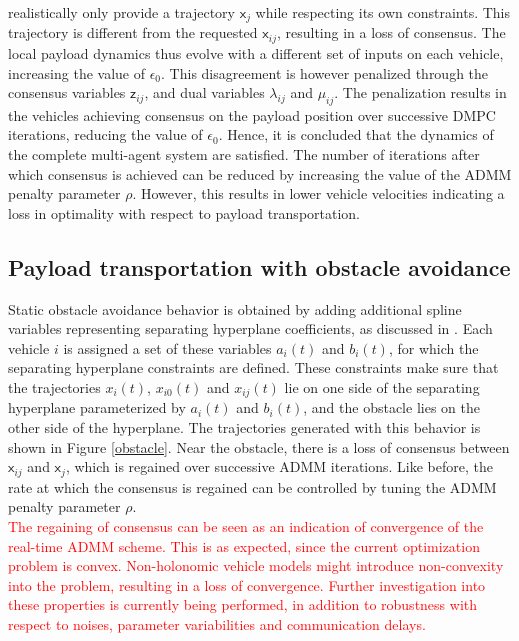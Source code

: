 \documentclass[letterpaper, 10 pt, conference]{ieeeconf}
\newcommand{\cx}{\textsf{x}}
\newcommand{\cz}{\textsf{z}}
\begin{document}
 realistically only provide a trajectory $\cx_j$ while respecting its own constraints. This trajectory is different from the requested $\cx_{ij}$, resulting in a loss of consensus. The local payload dynamics thus evolve with a different set of inputs on each vehicle, increasing the value of $\epsilon_0$. This disagreement is however penalized through the consensus variables $\cz_{ij}$, and dual variables $\lambda_{ij}$ and $\mu_{ij}$. The penalization results in the vehicles achieving consensus on the payload position over successive DMPC iterations, reducing the value of $\epsilon_0$. Hence, it is concluded that the dynamics of the complete multi-agent system are satisfied. The number of iterations after which consensus is achieved can be reduced by increasing the value of the ADMM penalty parameter $\rho$. However, this results in lower vehicle velocities indicating a loss in optimality with respect to payload transportation. 
 \\
 \indent
 \subsection{Payload transportation with obstacle avoidance}
Static obstacle avoidance behavior is obtained by adding additional spline variables representing separating hyperplane coefficients, as discussed in \cite{c15}. Each vehicle $i$ is assigned a set of these variables $a_i(t)$ and $b_i(t)$, for which the separating hyperplane constraints are defined. These constraints make sure that the trajectories $x_i(t)$, $x_{i0}(t)$ and $x_{ij}(t)$ lie on one side of the separating hyperplane parameterized by $a_i(t)$ and $b_i(t)$, and the obstacle lies on the other side of the hyperplane. The trajectories generated with this behavior is shown in Figure \ref{obstacle}. Near the obstacle, there is a loss of consensus between $\cx_{ij}$ and $\cx_{j}$, which is regained over successive ADMM iterations. Like before, the rate at which the consensus is regained can be controlled by tuning the ADMM penalty parameter $\rho$. \\
\indent
\textcolor{red}{The regaining of consensus can be seen as an indication of convergence of the real-time ADMM scheme. This is as expected, since the current optimization problem is convex. Non-holonomic vehicle models might introduce non-convexity into the problem, resulting in a loss of convergence. Further investigation into these properties is currently being performed, in addition to robustness with respect to noises, parameter variabilities and communication delays.}
\end{document}
